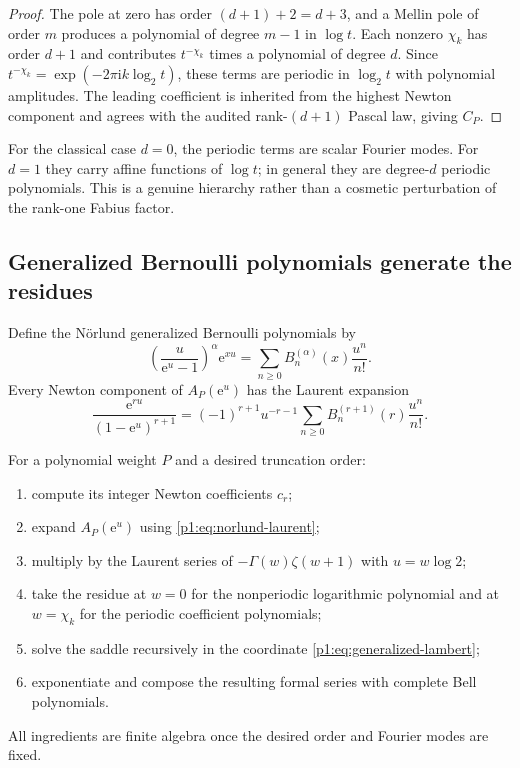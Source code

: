 \documentclass[11pt,oneside]{article}
\numberwithin{equation}{section}
\theoremstyle{definition}
\theoremstyle{remark}
\newcommand{\e}{\mathrm e}
\newcommand{\ii}{\mathrm i}
\begin{document}
\begin{proof}
The pole at zero has order $(d+1)+2=d+3$, and a Mellin pole of order $m$ produces a
polynomial of degree $m-1$ in $\log t$.  Each nonzero $\chi_k$ has order $d+1$ and contributes
$t^{-\chi_k}$ times a polynomial of degree $d$.  Since
$t^{-\chi_k}=\exp(-2\pi\ii k\log_2t)$, these terms are periodic in $\log_2t$ with polynomial
amplitudes.  The leading coefficient is inherited from the highest Newton component and
agrees with the audited rank-$(d+1)$ Pascal law, giving $C_P$.
\end{proof}

\begin{remark}
For the classical case $d=0$, the periodic terms are scalar Fourier modes.  For $d=1$ they
carry affine functions of $\log t$; in general they are degree-$d$ periodic polynomials.
This is a genuine hierarchy rather than a cosmetic perturbation of the rank-one Fabius
factor.
\end{remark}

\subsection{Generalized Bernoulli polynomials generate the residues}

Define the N\"orlund generalized Bernoulli polynomials \cite{p1:norlund1924} by
\begin{equation}
 \left(\frac u{\e^u-1}\right)^\alpha\e^{xu}
 =\sum_{n\ge0}B_n^{(\alpha)}(x)\frac{u^n}{n!}.
 \label{p1:eq:norlund-def}
\end{equation}
Every Newton component of $A_P(\e^u)$ has the Laurent expansion
\begin{equation}
 \boxed{
 \frac{\e^{ru}}{(1-\e^u)^{r+1}}
 =(-1)^{r+1}u^{-r-1}
  \sum_{n\ge0}B_n^{(r+1)}(r)\frac{u^n}{n!}.}
 \label{p1:eq:norlund-laurent}
\end{equation}

\begin{algorithm}
\label{p1:alg:bernoulli-bell}
For a polynomial weight $P$ and a desired truncation order:
\begin{enumerate}
\item compute its integer Newton coefficients $c_r$;
\item expand $A_P(\e^u)$ using \eqref{p1:eq:norlund-laurent};
\item multiply by the Laurent series of $-\Gamma(w)\zeta(w+1)$ with $u=w\log2$;
\item take the residue at $w=0$ for the nonperiodic logarithmic polynomial and at
      $w=\chi_k$ for the periodic coefficient polynomials;
\item solve the saddle recursively in the coordinate \eqref{p1:eq:generalized-lambert};
\item exponentiate and compose the resulting formal series with complete Bell polynomials.
\end{enumerate}
All ingredients are finite algebra once the desired order and Fourier modes are fixed.
\end{algorithm}
\end{document}
